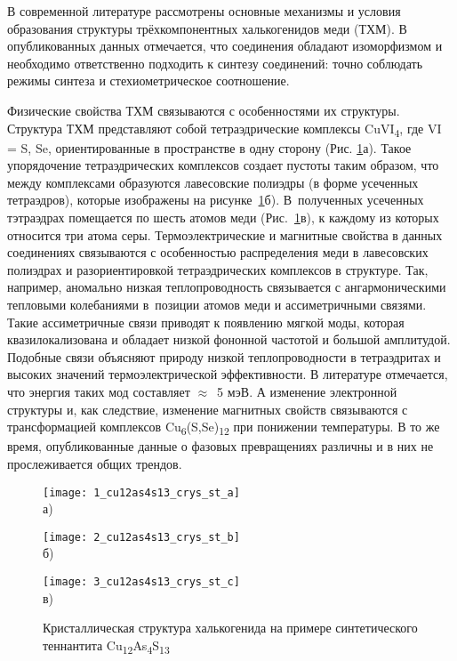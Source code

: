 В современной литературе рассмотрены основные механизмы и условия образования структуры трёхкомпонентных халькогенидов меди (ТХМ).
В опубликованных данных\cite{Pfitzner1998a} отмечается, что соединения обладают изоморфизмом и необходимо ответственно подходить к синтезу соединений: точно соблюдать режимы синтеза и стехиометрическое соотношение.

Физические свойства ТХМ связываются с особенностями их структуры. Структура ТХМ представляют собой тетраэдрические комплексы  CuVI\textsubscript{4}, где VI = S, Se, ориентированные в пространстве в одну сторону (Рис. \ref{img:figure1}а).
Такое упорядочение тетраэдрических комплексов создает пустоты таким образом, что между  комплексами образуются лавесовские полиэдры (в форме усеченных тетраэдров), которые изображены на рисунке~\ref{img:figure1}б). В~полученных усеченных тэтраэдрах помещается по шесть атомов меди (Рис.~\ref{img:figure1}в), к каждому из которых относится три атома серы\cite{Makovicky_2006}.
Термоэлектрические и магнитные свойства в данных соединениях связываются с особенностью распределения меди в лавесовских полиэдрах  и разориентировкой тетраэдрических комплексов в структуре. Так, например, аномально низкая теплопроводность связывается с ангармоническими тепловыми колебаниями в~позиции атомов меди\cite{Mishra2017} и ассиметричными связями\cite{Lai_2015}. Такие ассиметричные связи приводят к появлению мягкой моды, которая квазилокализована и обладает низкой фононной частотой и большой амплитудой. Подобные связи объясняют природу низкой теплопроводности в тетраэдритах и высоких значений термоэлектрической эффективности\cite{Lu2013}. В литературе отмечается\cite{Lai_2015}, что энергия таких мод составляет $\approx$~5 мэВ. А изменение электронной структуры и, как следствие, изменение магнитных свойств связываются с трансформацией комплексов  Cu\textsubscript{6}(S,Se)\textsubscript{12} при понижении температуры\cite{Gainov2008}. В то же время, опубликованные данные о фазовых превращениях различны и в них не прослеживается общих трендов.

\begin{figure}[ht]
  \begin{minipage}[ht]{0.3\linewidth}\centering
    \texttt{[image: 1\_cu12as4s13\_crys\_st\_a]} \\ а)
  \end{minipage}
  \hfill
  \begin{minipage}[ht]{0.3\linewidth}\centering
    \texttt{[image: 2\_cu12as4s13\_crys\_st\_b]} \\ б)
  \end{minipage}
\hfill
 \begin{minipage}[ht]{0.3\linewidth}\centering
    \texttt{[image: 3\_cu12as4s13\_crys\_st\_c]} \\ в)
  \end{minipage}
      \caption[Кристаллическая структура халькогенида на примере синтетического теннантита Cu\textsubscript{12}As\textsubscript{4}S\textsubscript{13}]{Кристаллическая структура халькогенида на примере синтетического теннантита Cu\textsubscript{12}As\textsubscript{4}S\textsubscript{13}}
    \label{img:figure1}
\end{figure}

